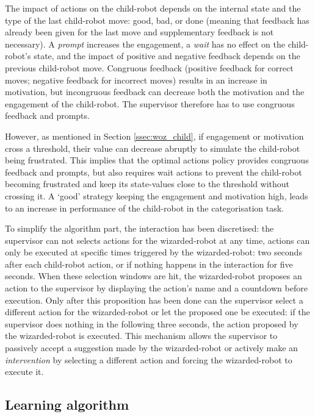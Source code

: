 The impact of actions on the child-robot depends on the internal state and the type of the last child-robot move: good, bad, or done (meaning that feedback has already been given for the last move and supplementary feedback is not necessary). A \textit{prompt} increases the engagement, a \textit{wait} has no effect on the child-robot's state, and the impact of positive and negative feedback depends on the previous child-robot move. Congruous feedback (positive feedback for correct moves; negative feedback for incorrect moves) results in an increase in motivation, but incongruous feedback can decrease both the motivation and the engagement of the child-robot. The supervisor therefore has to use congruous feedback and prompts.

However, as mentioned in Section \ref{ssec:woz_child}, if engagement or motivation cross a threshold, their value can decrease abruptly to simulate the child-robot being frustrated. This implies that the optimal actions policy provides congruous feedback and prompts, but also requires wait actions to prevent the child-robot becoming frustrated and keep its state-values close to the threshold without crossing it. A `good' strategy keeping the engagement and motivation high, leads to an increase in performance of the child-robot in the categorisation task.

To simplify the algorithm part, the interaction has been discretised: the supervisor can not selects actions for the wizarded-robot at any time, actions can only be executed at specific times triggered by the wizarded-robot: two seconds after each child-robot action, or if nothing happens in the interaction for five seconds. When these selection windows are hit, the wizarded-robot proposes an action to the supervisor by displaying the action's name and a countdown before execution. Only after this proposition has been done can the supervisor select a different action for the wizarded-robot or let the proposed one be executed: if the supervisor does nothing in the following three seconds, the action proposed by the wizarded-robot is executed. This mechanism allows the supervisor to passively accept a suggestion made by the wizarded-robot or actively make an \emph{intervention} by selecting a different action and forcing the wizarded-robot to execute it.

\subsection{Learning algorithm}

